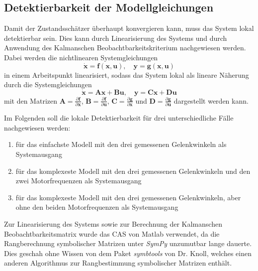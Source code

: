 \documentclass[times, 9pt,twocolumn]{article}
\begin{document}
	\subsection{Detektierbarkeit der Modellgleichungen}
	Damit der Zustandsschätzer überhaupt konvergieren kann, muss das System lokal detektierbar sein. Dies kann durch Linearisierung des Systems und durch Anwendung des Kalmanschen Beobachtbarkeitskriterium nachgewiesen werden. Dabei werden die nichtlinearen Systemgleichungen
	$$ \bm{\dot x} = \bm{f}(\bm{x},\bm{u}),\quad \bm y = \bm{g}(\bm{x}, \bm u) $$
	in einem Arbeitspunkt linearisiert, sodass das System lokal als lineare Näherung durch die Systemgleichungen
	$$ \bm{\dot x} = \bm{A} \bm{x} + \bm{B} \bm{u},\quad \bm y = \bm C \bm x + \bm D \bm u $$
	mit den Matrizen $ \bm A = \frac{\partial{ \bm f}}{\partial{\bm x}}$, $\bm B = \frac{\partial{ \bm f}}{\partial{\bm u}}$, $\bm C = \frac{\partial{ \bm g}}{\partial{\bm x}}$ und $\bm D = \frac{\partial{ \bm g}}{\partial{\bm u}}$ dargestellt werden kann.
	
	Im Folgenden soll die lokale Detektierbarkeit für drei unterschiedliche Fälle nachgewiesen werden:
	\begin{enumerate}
		\item für das einfachste Modell mit den drei gemessenen Gelenkwinkeln als Systemausgang
		\item für das komplexeste Modell mit den drei gemessenen Gelenkwinkeln und den zwei Motorfrequenzen als Systemausgang
		\item für das komplexeste Modell mit den drei gemessenen Gelenkwinkeln, aber ohne den beiden Motorfrequenzen als Systemausgang
	\end{enumerate}
	
	Zur Linearisierung des Systems sowie zur Berechnung der Kalmanschen Beobachtbarkeitsmatrix wurde das CAS von Matlab verwendet, da die Rangberechnung symbolischer Matrizen unter \textit{SymPy} unzumutbar lange dauerte. Dies geschah ohne Wissen von dem Paket \textit{symbtools} von Dr. Knoll, welches einen anderen Algorithmus zur Rangbestimmung symbolischer Matrizen enthält. 
\end{document}
